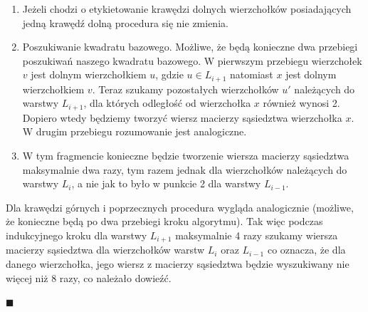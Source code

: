 \documentclass[12pt,a4paper,titlepage]{article}
\newcommand\tab[1][1cm]{\hspace*{#1}}
\begin{document}
\begin{enumerate}
\item 
Jeżeli chodzi o etykietowanie krawędzi dolnych wierzchołków posiadających jedną krawędź dolną procedura się nie zmienia.
\item
Poszukiwanie kwadratu bazowego. Możliwe, że będą konieczne dwa przebiegi poszukiwań naszego kwadratu bazowego. W pierwszym przebiegu wierzchołek $v$ jest dolnym wierzchołkiem $u$, gdzie $u \in L_{i+1}$ natomiast $x$ jest dolnym wierzchołkiem $v$. Teraz szukamy pozostałych wierzchołków $u'$ należących do warstwy $L_{i+1}$, dla których odległość od wierzchołka $x$ również wynosi 2. Dopiero wtedy będziemy tworzyć wiersz macierzy sąsiedztwa wierzchołka $x$. W drugim przebiegu rozumowanie jest analogiczne. 
\item
W tym fragmencie konieczne będzie tworzenie wiersza macierzy sąsiedztwa maksymalnie dwa razy, tym razem jednak dla wierzchołków należących do warstwy $L_i$, a nie jak to było w punkcie 2 dla warstwy $L_{i-1}$.
\end{enumerate}
\tab[0.6cm]Dla krawędzi górnych i poprzecznych procedura wygląda analogicznie (możliwe, że konieczne będą po dwa przebiegi kroku algorytmu). Tak więc podczas indukcyjnego kroku dla warstwy $L_{i+1}$ maksymalnie 4 razy szukamy wiersza macierzy sąsiedztwa dla wierzchołków warstw $L_{i} $ oraz $L_{i-1}$ co oznacza, że dla danego wierzchołka, jego wiersz z macierzy sąsiedztwa będzie wyszukiwany nie więcej niż 8 razy, co należało dowieźć. 
\begin{flushright}
$\blacksquare$
\end{flushright}
\end{document}
